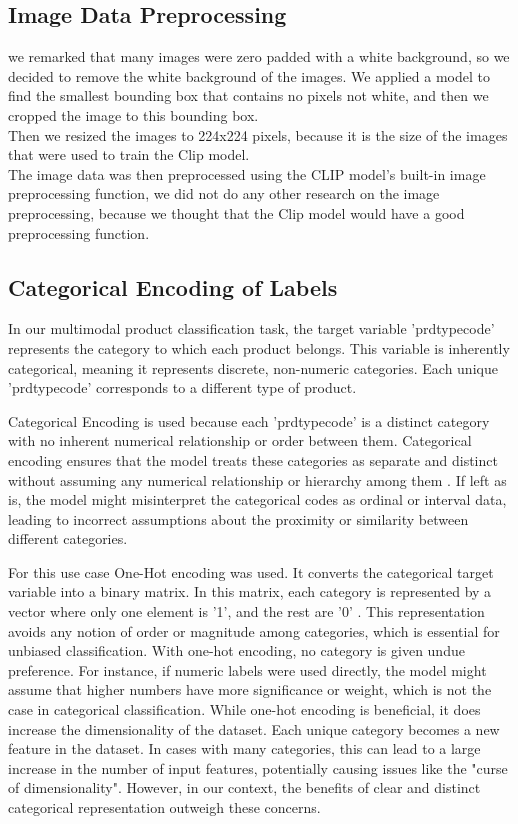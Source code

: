 \subsection{Image Data Preprocessing}

we remarked that many images were zero padded with a white background, so we decided to remove the white background of the images. We applied a model to find the smallest bounding box that contains no pixels not white, and then we cropped the image to this bounding box.\\
Then we resized the images to 224x224 pixels, because it is the size of the images that were used to train the Clip model.\\

The image data was then preprocessed using the CLIP model's built-in image preprocessing function, we did not do any  other research on the image preprocessing, because we thought that the Clip model would have a good preprocessing function.\\


\subsection{Categorical Encoding of Labels}

In our multimodal product classification task, the target variable 'prdtypecode' represents the category to which each product belongs. This variable is inherently categorical, meaning it represents discrete, non-numeric categories. Each unique 'prdtypecode' corresponds to a different type of product.

Categorical Encoding is used because each 'prdtypecode' is a distinct category with no inherent numerical relationship or order between them. Categorical encoding ensures that the model treats these categories as separate and distinct without assuming any numerical relationship or hierarchy among them \cite{potdar-2017}. If left as is, the model might misinterpret the categorical codes as ordinal or interval  data, leading to incorrect assumptions about the proximity or similarity between different categories.

For this use case One-Hot encoding was used. It converts the categorical target variable into a binary matrix. In this matrix, each category is represented by a vector where only one element is '1', and the rest are '0' \cite{cerda-2018}. This representation avoids any notion of order or magnitude among categories, which is essential for unbiased classification.
With one-hot encoding, no category is given undue preference. For instance, if numeric labels were used directly, the model might assume that higher numbers have more significance or weight, which is not the case in categorical classification.
While one-hot encoding is beneficial, it does increase the dimensionality of the dataset. Each unique category becomes a new feature in the dataset. In cases with many categories, this can lead to a large increase in the number of input features, potentially causing issues like the "curse of dimensionality"\cite{altman-2018}. However, in our context, the benefits of clear and distinct categorical representation outweigh these concerns.

